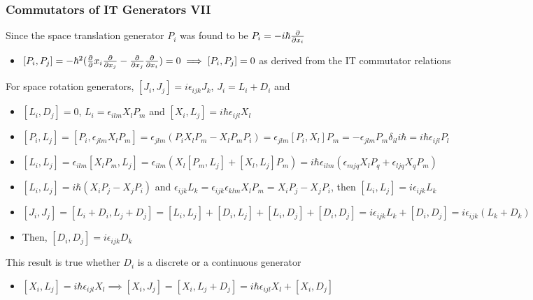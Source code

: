\documentclass[8pt,t,mathserif,aspectratio=169]{beamer}
\begin{document}
\begin{frame}
  \frametitle{Commutators of IT Generators VII}
  \vspace{1mm}
  Since the space translation generator $P_i$ was found to be $P_i = -i \hbar {\partial \over \partial x_i}$
  \begin{itemize}
    \item $[P_i,P_j] = - \hbar^2 ({\partial \over \partial} x_i {\partial \over \partial x_j} - {\partial \over \partial x_j} {\partial \over \partial x_i}) = 0 \implies [P_i,P_j] = 0$ as derived from the IT commutator relations
  \end{itemize}
  For space rotation generators, $[J_i,J_j] = i \epsilon_{ijk} J_k$, $J_i = L_i + D_i$ and
  \begin{itemize}
    \item $[L_i,D_j] = 0$, $L_i = \epsilon_{ilm} X_l P_m$ and $[X_i,L_j] = i \hbar \epsilon_{ijl} X_l$
    \item $[P_i,L_j] = [P_i,\epsilon_{jlm} X_l P_m] = \epsilon_{jlm} (P_i X_l P_m - X_l P_m P_i) = \epsilon_{jlm} [P_i,X_l] P_m = -\epsilon_{jlm} P_m \delta_{il} i \hbar = i \hbar \epsilon_{ijl} P_l$
    \item $[L_i,L_j] = \epsilon_{ilm} [X_l P_m,L_j] = \epsilon_{ilm} (X_l [P_m,L_j] + [X_l,L_j] P_m) = i \hbar \epsilon_{ilm} (\epsilon_{mjq} X_l P_q + \epsilon_{ljq} X_q P_m)$
    \item $[L_i,L_j] = i \hbar (X_i P_j - X_j P_i)$ and $\epsilon_{ijk} L_k = \epsilon_{ijk} \epsilon_{klm} X_l P_m = X_i P_j - X_j P_i$, then $[L_i,L_j] = i \epsilon_{ijk} L_k$
    \item $[J_i,J_j] = [L_i + D_i,L_j + D_j] = [L_i,L_j] + [D_i,L_j] + [L_i,D_j] + [D_i,D_j] = i \epsilon_{ijk} L_k + [D_i,D_j] = i \epsilon_{ijk} (L_k + D_k)$
    \item Then, $[D_i,D_j] = i \epsilon_{ijk} D_k$
  \end{itemize}
  This result is true whether $D_i$ is a discrete or a continuous generator
  \begin{itemize}
    \item $[X_i,L_j] = i \hbar \epsilon_{ijl} X_l \implies [X_i,J_j] = [X_i,L_j + D_j] = i \hbar \epsilon_{ijl} X_l + [X_i,D_j]$
  \end{itemize}
\end{frame}
\end{document}
